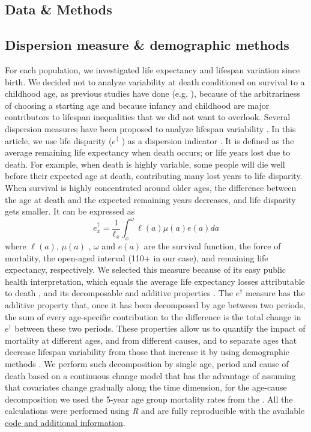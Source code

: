 \documentclass{article}
\begin{document}
\begin{spacing}{1.5}
\section*{Data \& Methods}

\subsection*{Dispersion measure \& demographic methods}

For each population, we investigated life expectancy and lifespan variation since birth. We decided not to analyze variability at death conditioned on survival to a childhood age, as previous studies have done (e.g. \citet{edwards2005, smits2009}), because of the arbitrariness of choosing a starting age and because infancy and childhood are major contributors to lifespan inequalities that we did not want to overlook. 
Several dispersion measures have been proposed to analyze lifespan variability \citep{vanraalte2013, wilmoth1999}. In this article, we use life disparity ($e^{\dagger}$ ) as a dispersion indicator \citep{vaupel&Canudas2003}. It is defined as the average remaining life expectancy when death occurs; or life years lost due to death.  For example, when death is highly variable, some people will die well before their expected age at death, contributing many lost years to life disparity. When survival is highly concentrated around older ages, the difference between the age at death and the expected remaining years decreases, and life disparity gets smaller.  It can be expressed as
\begin{equation}
\label{eq.edagger}
e_x^{\dagger}=\frac{1}{\ell_x}\int_x^\omega \ell(a) \mu(a)e(a)da
\end{equation}
where $\ell(a)$, $\mu(a)$ , $\omega$ and $e(a)$ are the survival function, the force of mortality, the open-aged interval (110+ in our case), and remaining life expectancy, respectively. 
We selected this measure because of its easy public health interpretation, which equals the average life expectancy losses attributable to death \citep{shkolnikov2011}, and its decomposable and additive properties \citep{zhang2009}. The $e^\dagger$ measure has the additive property that, once it has been decomposed by age between two periods, the sum of every age-specific contribution to the difference is the total change in $e^\dagger$ between these two periods. These properties allow us to quantify the impact of mortality at different ages, and from different causes, and to separate ages that decrease lifespan variability from those that increase it by using demographic methods \citep{zhang2009, shkolnikov2011}. We perform such decomposition by single age, period and cause of death based on a continuous change model \citep{horiuchi2008} that has the advantage of assuming that covariates change gradually along the time dimension, for the age-cause decomposition we used the 5-year age group mortality rates from the \cite{HMD}. All the calculations were performed using \textit{R} \citep{team2000r} and are fully reproducible with the available \href{https://goo.gl/YhEgix}{code and additional information}.\\


\end{spacing}
\end{document}
